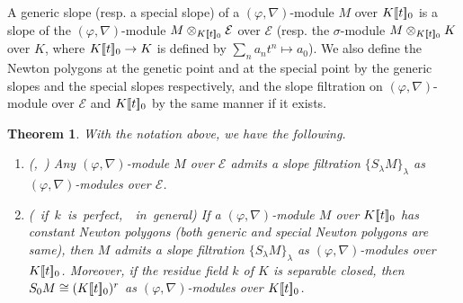 \documentclass[11pt]{amsart}
\newtheorem{theorem}[Lemma]{Theorem}
\begin{document}
A generic slope (resp. a special slope) 
of a $(\varphi, \nabla)$-module $M$ over $K[\hspace*{-0.6mm}[t]\hspace*{-0.6mm}]_0$ 
is a slope of the $(\varphi, \nabla)$-module $M \otimes_{K[\hspace*{-0.6mm}[t]\hspace*{-0.6mm}]_0}\mathcal E$ 
over $\mathcal E$ (resp. the $\sigma$-module $M \otimes_{K[\hspace*{-0.6mm}[t]\hspace*{-0.6mm}]_0} K$ 
over $K$, where $K[\hspace*{-0.6mm}[t]\hspace*{-0.6mm}]_0 \rightarrow K$ is defined by $\sum_na_nt^n \mapsto a_0$). 
We also define the Newton polygons at the genetic point and at the special point by the generic slopes 
and the special slopes respectively, 
and the slope filtration on $(\varphi, \nabla)$-module over $\mathcal E$  
and $K[\hspace*{-0.6mm}[t]\hspace*{-0.6mm}]_0$ 
by the same manner if it exists. 

\begin{theorem}\label{sfil} 
With the notation above, we have the following. 
\begin{enumerate}
\item \mbox{\rm (\cite[Remark 1.7.8]{Ke0}, \cite[Theorems 2.4]{CT})}
Any $(\varphi, \nabla)$-module $M$ over $\mathcal E$ 
admits a slope filtration $\{ S_\lambda M \}_\lambda$ as $(\varphi, \nabla)$-modules over $\mathcal E$. 
\item \mbox{\rm (\cite[Corollary 2.6.2]{Kat} if $k$ is perfect, 
\cite[Theorems 6.21]{CT} in general)} 
If a $(\varphi, \nabla)$-module $M$ over $K[\hspace*{-0.6mm}[t]\hspace*{-0.6mm}]_0$ 
has constant Newton polygons 
(both generic and special Newton polygons are same), then 
$M$ admits a slope filtration $\{ S_\lambda M \}_\lambda$ as $(\varphi, \nabla)$-modules over 
$K[\hspace*{-0.6mm}[t]\hspace*{-0.6mm}]_0$. 
Moreover, if the residue field $k$ of $K$ is separable closed, then 
$S_0 M \cong (K[\hspace*{-0.6mm}[t]\hspace*{-0.6mm}]_0)^r$ as $(\varphi, \nabla)$-modules 
over $K[\hspace*{-0.6mm}[t]\hspace*{-0.6mm}]_0$. 
\end{enumerate}
\end{theorem}
\end{document}
